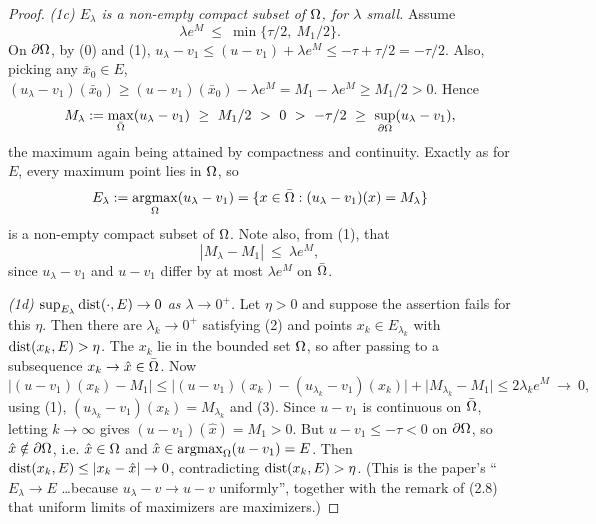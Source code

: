 \begin{proof}
\emph{(1c) $E_\lambda$ is a non-empty compact subset of $\Omega$, for $\lambda$ small.}
Assume
\[
 \lambda e^{M}\ \le\ \min\{\tau/2,\ M_1/2\} . \tag{2}
\]
On $\partial\Omega$, by (0) and (1), $u_\lambda-v_1\le(u-v_1)+\lambda e^{M}\le-\tau+\tau/2=-\tau/2$.
Also, picking any $\bar x_0\in E$, $(u_\lambda-v_1)(\bar x_0)\ge(u-v_1)(\bar x_0)-\lambda e^{M}
=M_1-\lambda e^{M}\ge M_1/2>0$. Hence
\[
 M_\lambda:=\max_{\bar\Om}(u_\lambda-v_1)\ \ge\ M_1/2\ >\ 0\ >\ -\tau/2\ \ge\ \sup_{\del\Om}(u_\lambda-v_1),
\]
the maximum again being attained by compactness and continuity. Exactly as for $E$, every
maximum point lies in $\Omega$, so
\[
 E_\lambda:=\operatorname*{argmax}_\Omega(u_\lambda-v_1)=\{x\in\bar{\Omega}:(u_\lambda-v_1)(x)=M_\lambda\}
\]
is a non-empty compact subset of $\Omega$. Note also, from (1), that
\[
 |M_\lambda-M_1|\ \le\ \lambda e^{M} , \tag{3}
\]
since $u_\lambda-v_1$ and $u-v_1$ differ by at most $\lambda e^{M}$ on $\bar{\Omega}$.

\emph{(1d) $\sup_{E_\lambda}\operatorname{dist}(\cdot,E)\to0$ as $\lambda\to0^{+}$.} Let $\eta>0$ and
suppose the assertion fails for this $\eta$. Then there are $\lambda_k\to0^{+}$ satisfying
(2) and points $x_k\in E_{\lambda_k}$ with $\operatorname{dist}(x_k,E)>\eta$. The $x_k$ lie in the
bounded set $\Omega$, so after passing to a subsequence $x_k\to\hat x\in\bar{\Omega}$. Now
\[
 \big|(u-v_1)(x_k)-M_1\big|
 \le\big|(u-v_1)(x_k)-(u_{\lambda_k}-v_1)(x_k)\big|+\big|M_{\lambda_k}-M_1\big|
 \le2\lambda_ke^{M}\ \longrightarrow\ 0 ,
\]
using (1), $(u_{\lambda_k}-v_1)(x_k)=M_{\lambda_k}$ and (3). Since $u-v_1$ is continuous on
$\bar{\Omega}$, letting $k\to\infty$ gives $(u-v_1)(\hat x)=M_1>0$. But $u-v_1\le-\tau<0$ on
$\partial\Omega$, so $\hat x\notin\partial\Omega$, i.e. $\hat x\in\Omega$ and $\hat x\in\operatorname*{argmax}_\Omega(u-v_1)=E$.
Then $\operatorname{dist}(x_k,E)\le|x_k-\hat x|\to0$, contradicting $\operatorname{dist}(x_k,E)>\eta$. (This is the
paper's ``$E_\lambda\to E$ \dots because $u_\lambda-v\to u-v$ uniformly'', together with
the remark of (2.8) that uniform limits of maximizers are maximizers.)


\end{proof}
